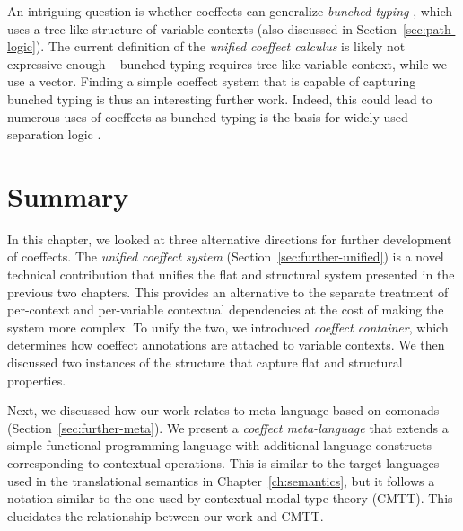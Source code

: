 An intriguing question is whether coeffects can generalize \emph{bunched typing} \cite{substruct-bunched},
which uses a tree-like structure of variable contexts (also discussed in Section~\ref{sec:path-logic}).
The current definition of the \emph{unified coeffect calculus} is likely not expressive enough -- bunched
typing requires tree-like variable context, while we use a vector. Finding a simple coeffect system
that is capable of capturing bunched typing is thus an interesting further work. Indeed, this could
lead to numerous uses of coeffects as bunched typing is the basis for widely-used
separation logic \cite{substruct-separation-logic}.



%
%

\section{Summary}

In this chapter, we looked at three alternative directions for further development of coeffects.
The \emph{unified coeffect system} (Section~\ref{sec:further-unified}) is a novel technical 
contribution that unifies the flat and structural system presented
in the previous two chapters. This provides an alternative to the separate treatment of
per-context and per-variable contextual dependencies at the cost of making the system more
complex. To unify the two, we introduced \emph{coeffect container}, which determines how 
coeffect annotations are attached to variable contexts. We then discussed two
instances of the structure that capture flat and structural properties.

Next, we discussed how our work relates to meta-language based on comonads (Section~\ref{sec:further-meta}).
We present a \emph{coeffect meta-language} that extends a simple functional programming language
with additional language constructs corresponding to contextual operations. This is similar to the
target languages used in the translational semantics in Chapter~\ref{ch:semantics}, but it follows
a notation similar to the one used by contextual modal type theory (CMTT). This elucidates the
relationship between our work and CMTT.

